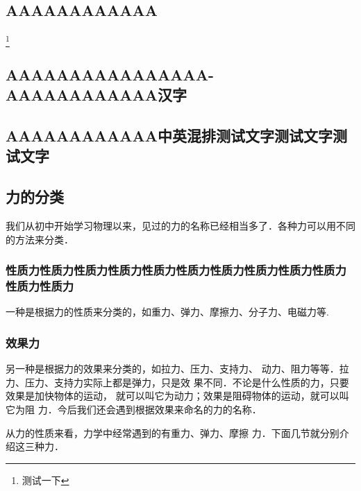 \begin{Paracol}
\subsection{AAAAAAAAAAAA}

\lipsum[1]\footnote{测试一下}


\subsection{AAAAAAAAAAAAAAAA-AAAAAAAAAAAA汉字}

\lipsum[2]



\subsection{AAAAAAAAAAAA中英混排测试文字测试文字测试文字}


\lipsum[3]


\subsection{力的分类}

我们从初中开始学习物理以来，见过的力的名称已经相当多了．各种力可以用不同的方法来分类．

\subsubsection{性质力性质力性质力性质力性质力性质力性质力性质力性质力性质力性质力性质力}
一种是根据力的性质来分类的，如重力、弹力、摩擦力、分子力、电磁力等.

\subsubsection{效果力}
另一种是根据力的效果来分类的，如拉力、压力、支持力、
动力、阻力等等．拉力、压力、支持力实际上都是弹力，只是效
果不同．不论是什么性质的力，只要效果是加快物体的运动，
就可以叫它为动力；效果是阻碍物体的运动，就可以叫它为阻
力．今后我们还会遇到根据效果来命名的力的名称．

    从力的性质来看，力学中经常遇到的有重力、弹力、摩擦
力．下面几节就分别介绍这三种力．

\end{Paracol}

\begin{Thinking}
	\lipsum[1-2]
\end{Thinking}



